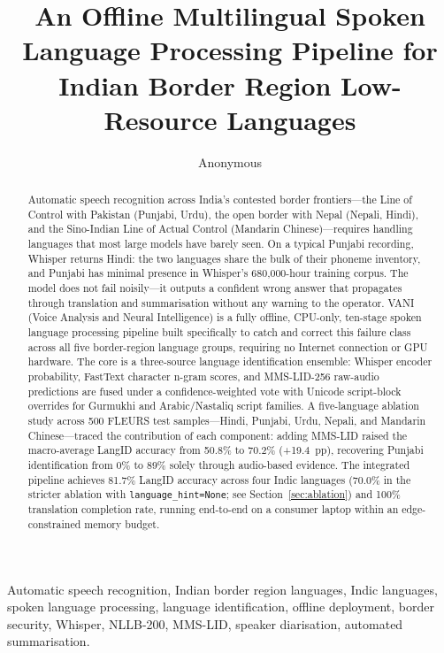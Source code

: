 \documentclass[12pt, onecolumn]{IEEEtran}
\begin{document}
\linenumbers
\doublespacing

\title{An Offline Multilingual Spoken Language Processing Pipeline for Indian Border Region Low-Resource Languages}

\author{Anonymous}

\maketitle

\begin{abstract}
Automatic speech recognition across India's contested border frontiers---the Line of Control with Pakistan (Punjabi, Urdu), the open border with Nepal (Nepali, Hindi), and the Sino-Indian Line of Actual Control (Mandarin Chinese)---requires handling languages that most large models have barely seen. On a typical Punjabi recording, Whisper returns Hindi: the two languages share the bulk of their phoneme inventory, and Punjabi has minimal presence in Whisper's 680,000-hour training corpus. The model does not fail noisily---it outputs a confident wrong answer that propagates through translation and summarisation without any warning to the operator. VANI (Voice Analysis and Neural Intelligence) is a fully offline, CPU-only, ten-stage spoken language processing pipeline built specifically to catch and correct this failure class across all five border-region language groups, requiring no Internet connection or GPU hardware. The core is a three-source language identification ensemble: Whisper encoder probability, FastText character n-gram scores, and MMS-LID-256 raw-audio predictions are fused under a confidence-weighted vote with Unicode script-block overrides for Gurmukhi and Arabic/Nastaliq script families. A five-language ablation study across 500 FLEURS test samples---Hindi, Punjabi, Urdu, Nepali, and Mandarin Chinese---traced the contribution of each component: adding MMS-LID raised the macro-average LangID accuracy from 50.8\% to 70.2\% (+19.4~pp), recovering Punjabi identification from 0\% to 89\% solely through audio-based evidence. The integrated pipeline achieves 81.7\% LangID accuracy across four Indic languages (70.0\% in the stricter ablation with \texttt{language\_hint=None}; see Section~\ref{sec:ablation}) and 100\% translation completion rate, running end-to-end on a consumer laptop within an edge-constrained memory budget.
\end{abstract}

\begin{IEEEkeywords}
Automatic speech recognition, Indian border region languages, Indic languages, spoken language processing, language identification, offline deployment, border security, Whisper, NLLB-200, MMS-LID, speaker diarisation, automated summarisation.
\end{IEEEkeywords}
\end{document}
